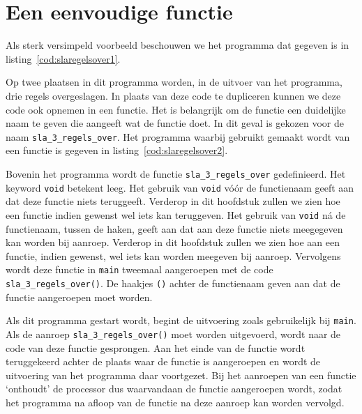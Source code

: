 \section{Een eenvoudige functie}
Als sterk versimpeld voorbeeld beschouwen we het programma dat gegeven is in listing~\ref{cod:slaregelsover1}.


Op twee plaatsen in dit programma worden, in de uitvoer van het programma, drie regels overgeslagen.
In plaats van deze code te dupliceren kunnen we deze code ook opnemen in een functie.
Het is belangrijk om de functie een duidelijke naam te geven die aangeeft wat de functie doet.
In dit geval is gekozen voor de naam \texttt{sla\_3\_regels\_over}.
Het programma waarbij gebruikt gemaakt wordt van een functie is gegeven in listing~\ref{cod:slaregelsover2}.


Bovenin het programma wordt de functie \texttt{sla\_3\_regels\_over} gedefinieerd.
Het keyword \texttt{void} betekent leeg.
Het gebruik van \texttt{void} vóór de functienaam geeft aan dat deze functie niets teruggeeft.
Verderop in dit hoofdstuk zullen we zien hoe een functie indien gewenst wel iets kan teruggeven.
Het gebruik van \texttt{void} n\'a de functienaam, tussen de haken, geeft aan dat aan deze functie niets meegegeven kan worden bij aanroep. 
Verderop in dit hoofdstuk zullen we zien hoe aan een functie, indien gewenst, wel iets kan worden meegeven bij aanroep.
Vervolgens wordt deze functie in \texttt{main} tweemaal aangeroepen met de code \texttt{sla\_3\_regels\_over()}.
De haakjes \texttt{()} achter de functienaam geven aan dat de functie aangeroepen moet worden.
 
Als dit programma gestart wordt, begint de uitvoering zoals gebruikelijk bij \texttt{main}.
Als de aanroep \texttt{sla\_3\_regels\_over()} moet worden uitgevoerd, wordt naar de code van deze functie gesprongen.
Aan het einde van de functie wordt teruggekeerd achter de plaats waar de functie is aangeroepen en wordt de uitvoering van het programma daar voortgezet.
Bij het aanroepen van een functie `onthoudt' de processor dus waarvandaan de functie aangeroepen wordt, zodat het programma na afloop van de functie na deze aanroep kan worden vervolgd.

